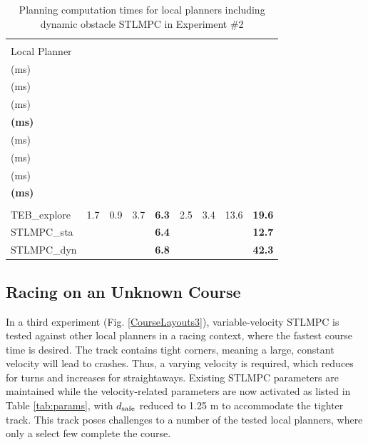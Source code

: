 \documentclass[journal]{IEEEtran}
\begin{document}
\begin{table}[!ht]
\caption{Planning computation times for local planners including dynamic obstacle STLMPC in Experiment \#2}
\label{tab:STLMPCcomp4}
\vspace{-8pt}
\centering
\begin{tabular}{
    l@{\hskip 2.4pt}c@{\hskip 4.0pt}c@{\hskip 4.0pt}c@{\hskip 5.5pt}c@{\hskip 3.2pt}c@{\hskip 3.2pt}c@{\hskip 3.2pt}c@{\hskip 3.2pt}c
}
\toprule\\[-1.2em]
\scriptsize Local Planner &
\makecell{\scriptsize$\bar{t}_\textup{frn}$\\(ms)} &
\makecell{\scriptsize$\bar{t}_\textup{glb}$\\(ms)} &
\makecell{\scriptsize$\bar{t}_\textup{loc}$\\(ms)} &
\makecell{\scriptsize\bm{$\bar{t}_\textbf{comp}$}\\\textbf{(ms)}} &
\makecell{\scriptsize$\max t_\textup{frn}$\\(ms)} &
\makecell{\scriptsize$\max t_\textup{glb}$\\(ms)} &
\makecell{\scriptsize$\max t_\textup{loc}$\\(ms)} &
\makecell{\scriptsize$\bm{\max t_\textbf{comp}}$\\\textbf{(ms)}} \\
\midrule\\[-1.2em] 
{\scriptsize TEB\_explore} & 1.7 & 0.9 & 3.7 & \textbf{6.3} & 2.5 & 3.4 & 13.6 & \textbf{19.6}  \\
{\scriptsize STLMPC\_sta} & \multicolumn{3}{c}{~~~} & \textbf{6.4} & \multicolumn{3}{c}{~~~} & \textbf{12.7}  \\
{\scriptsize STLMPC\_dyn} & \multicolumn{3}{c}{~~~} & \textbf{6.8} & \multicolumn{3}{c}{~~~} & \textbf{42.3}  \\
\bottomrule
\end{tabular}
\end{table}

\subsection{Racing on an Unknown Course}\label{sec:exp3}
In a third experiment (Fig. \ref{CourseLayouts3}), variable-velocity STLMPC is tested against other local planners in a racing context, where the fastest course time is desired. The track contains tight corners, meaning a large, constant velocity will lead to crashes. Thus, a varying velocity is required, which reduces for turns and increases for straightaways. Existing STLMPC parameters are maintained while the velocity-related parameters are now activated as listed in Table \ref{tab:params}, with $d_\textup{safe}$ reduced to 1.25 m to accommodate the tighter track. This track poses challenges to a number of the tested local planners, where only a select few complete the course.
\end{document}
